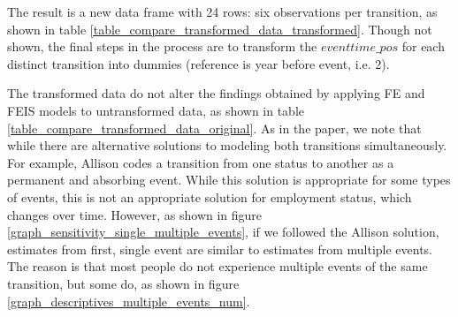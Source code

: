 The result is a new data frame with 24 rows: six observations per transition, as shown in table \ref{table_compare_transformed_data_transformed}.  Though not shown, the final steps in the process are to transform the $eventtime\_pos$ for each distinct transition into dummies (reference is year before event, i.e. 2).  

The transformed data do not alter the findings obtained by applying FE and FEIS models to untransformed data, as shown in table \ref{table_compare_transformed_data_original}.  As in the paper, we note that while there are alternative solutions to modeling both transitions simultaneously.  For example, Allison \citeyearpar{allison_asymmetric_2019} codes a transition from one status to another as a permanent and absorbing event.  While this solution is appropriate for some types of events, this is not an appropriate solution for employment status, which changes over time.  However, as shown in figure \ref{graph_sensitivity_single_multiple_events}, if we followed the Allison solution, estimates from first, single event are similar to estimates from multiple events.  The reason is that most people do not experience multiple events of the same transition, but some do, as shown in figure \ref{graph_descriptives_multiple_events_num}.  



